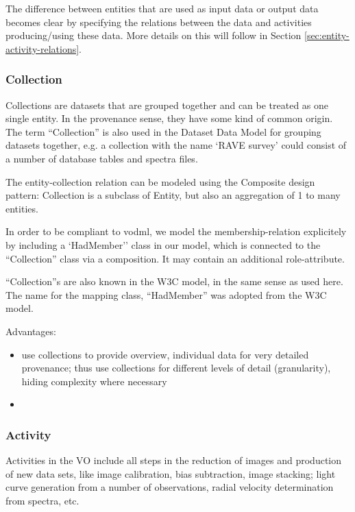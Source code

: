 The difference between entities that are used as input data or output data 
becomes clear by specifying the relations between the data and activities producing/using these data.
More details on this will follow in Section \ref{sec:entity-activity-relations}.


\subsubsection{Collection}
Collections are datasets that are grouped together and can be treated as one single entity. 
In the provenance sense, they have some kind of common origin. The term ``Collection'' is 
also used in the Dataset Data Model for grouping datasets together, e.g. a collection 
with the name `RAVE survey' could consist of a number of database tables and spectra files.

The entity-collection relation can be modeled using the Composite design pattern: 
Collection is a subclass of Entity, but also an aggregation of 1 to many entities.

In order to be compliant to vodml, we model the membership-relation explicitely 
by including a `HadMember'' class in our model, which is connected to the
``Collection'' class via a composition. It may contain an additional role-attribute.

``Collection''s are also known in the W3C model, in the same sense as used here. 
The name for the mapping class, ``HadMember'' was adopted from the W3C model.

Advantages:
\begin{itemize}
\item use collections to provide overview, individual data for very detailed provenance; 
	  thus use collections for different levels of detail (granularity), hiding 
	  complexity where necessary
\item {}
\end{itemize}



\subsubsection{Activity}
Activities in the VO include all steps in the reduction of images and production of new data sets, like image calibration, bias subtraction, image stacking; light curve generation from a number of observations, radial velocity determination from spectra, etc.

